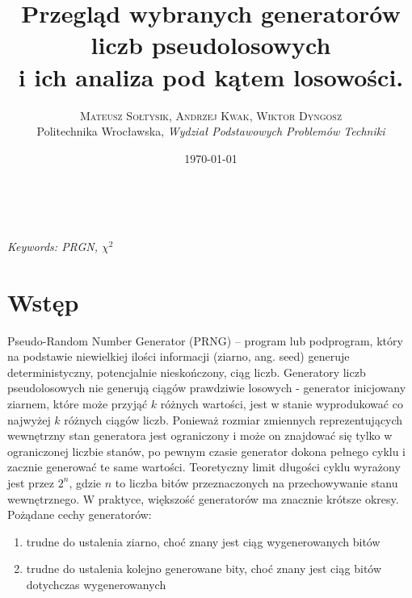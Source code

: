 \documentclass[a4paper, 11pt]{article} %
\title{\textbf{Przegląd wybranych generatorów liczb pseudolosowych}\\ %
i ich analiza pod kątem losowości.} %
\author{\textsc{Mateusz Sołtysik, Andrzej Kwak, Wiktor Dyngosz} %
\\{Politechnika Wrocławska, \textit{Wydział Podstawowych Problemów Techniki}}} %
\date{\today} %
\makeatletter
\renewcommand{\maketitle}{ %
\begin{flushright} %
{\LARGE\@title} %

\vspace{50pt} %

{\large\@author} %
\\\@date %

\vspace{40pt} %
\end{flushright}
}
\makeatother
\begin{document}
\maketitle %



\begin{abstract}
\end{abstract}

\hspace*{3,6mm}\textit{Keywords: PRGN,  $\chi^2$} 

\vspace{30pt} %

\section*{Wstęp}
Pseudo-Random Number Generator (PRNG) – program lub podprogram, który na podstawie niewielkiej ilości informacji (ziarno, ang. seed) generuje deterministyczny, potencjalnie nieskończony, ciąg liczb. Generatory liczb pseudolosowych nie generują ciągów prawdziwie losowych - generator inicjowany ziarnem, które może przyjąć $k$ różnych wartości, jest w stanie wyprodukować co najwyżej $k$ różnych ciągów liczb. Ponieważ rozmiar zmiennych reprezentujących wewnętrzny stan generatora jest ograniczony i może on znajdować się tylko w ograniczonej liczbie stanów, po pewnym czasie generator dokona pełnego cyklu i zacznie generować te same wartości. Teoretyczny limit długości cyklu wyrażony jest przez $2^n$, gdzie $n$ to liczba bitów przeznaczonych na przechowywanie stanu wewnętrznego. W praktyce, większość generatorów ma znacznie krótsze okresy.
\\Pożądane cechy generatorów:
\begin{enumerate}
\item trudne do ustalenia ziarno, choć znany jest ciąg wygenerowanych bitów
\item trudne do ustalenia kolejno generowane bity, choć znany jest ciąg bitów dotychczas wygenerowanych 
\end{enumerate}

\end{document}
